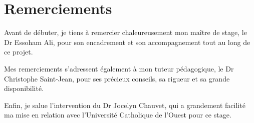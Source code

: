 \documentclass[12pt,a4paper]{report}
\begin{document}

\newpage

\tableofcontents

\section*{Remerciements}
Avant de débuter, je tiens à remercier chaleureusement mon 
maître de stage, le Dr Essoham Ali, pour son encadrement et son 
accompagnement tout au long de ce projet.

Mes remerciements s'adressent également à mon tuteur pédagogique, 
le Dr Christophe Saint-Jean, pour ses précieux conseils, 
sa rigueur et sa grande disponibilité.

Enfin, je salue l'intervention du Dr Jocelyn Chauvet, 
qui a grandement facilité ma mise en relation avec l'Université 
Catholique de l'Ouest pour ce stage.

\newpage










% 








\newpage
\nocite{*}
\printbibliography[title={Bibliographie}]
\end{document}
